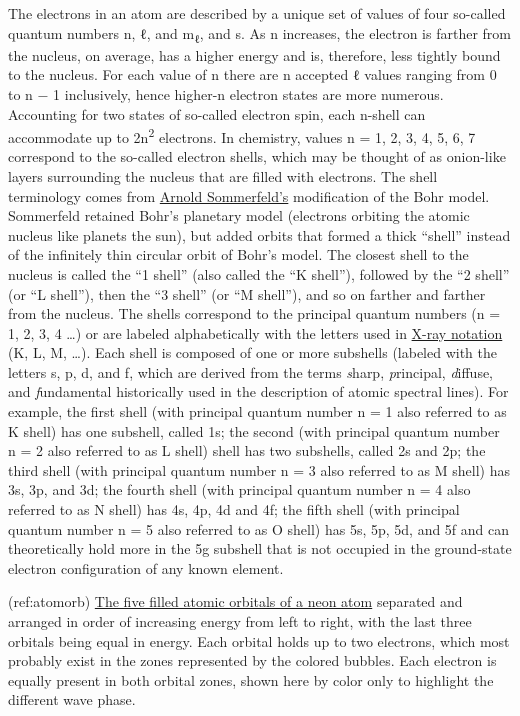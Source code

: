 \documentclass[
]{article}
\begin{document}
The electrons in an atom are described by a unique set of values of four
so-called quantum numbers n, ℓ, and m\textsubscript{ℓ}, and s. As n
increases, the electron is farther from the nucleus, on average, has a
higher energy and is, therefore, less tightly bound to the nucleus. For
each value of n there are n accepted ℓ values ranging from 0 to n − 1
inclusively, hence higher-n electron states are more numerous.
Accounting for two states of so-called electron spin, each n-shell can
accommodate up to 2n\textsuperscript{2} electrons. In chemistry, values
n = 1, 2, 3, 4, 5, 6, 7 correspond to the so-called electron shells,
which may be thought of as onion-like layers surrounding the nucleus
that are filled with electrons. The shell terminology comes from
\href{https://en.wikipedia.org/wiki/Arnold_Sommerfeld}{Arnold
Sommerfeld's} modification of the Bohr model. Sommerfeld retained Bohr's
planetary model (electrons orbiting the atomic nucleus like planets the
sun), but added orbits that formed a thick ``shell'' instead of the
infinitely thin circular orbit of Bohr's model. The closest shell to the
nucleus is called the ``1 shell'' (also called the ``K shell''),
followed by the ``2 shell'' (or ``L shell''), then the ``3 shell'' (or
``M shell''), and so on farther and farther from the nucleus. The shells
correspond to the principal quantum numbers (n = 1, 2, 3, 4 \ldots) or
are labeled alphabetically with the letters used in
\href{https://en.wikipedia.org/wiki/x-ray_notation}{X-ray notation} (K,
L, M, \ldots). Each shell is composed of one or more subshells (labeled
with the letters s, p, d, and f, which are derived from the terms
\emph{s}harp, \emph{p}rincipal, \emph{d}iffuse, and \emph{f}undamental
historically used in the description of atomic spectral lines). For
example, the first shell (with principal quantum number n = 1 also
referred to as K shell) has one subshell, called 1s; the second (with
principal quantum number n = 2 also referred to as L shell) shell has
two subshells, called 2s and 2p; the third shell (with principal quantum
number n = 3 also referred to as M shell) has 3s, 3p, and 3d; the fourth
shell (with principal quantum number n = 4 also referred to as N shell)
has 4s, 4p, 4d and 4f; the fifth shell (with principal quantum number n
= 5 also referred to as O shell) has 5s, 5p, 5d, and 5f and can
theoretically hold more in the 5g subshell that is not occupied in the
ground-state electron configuration of any known element.

(ref:atomorb)
\href{https://commons.wikimedia.org/wiki/File:S-p-Orbitals.svg}{The five
filled atomic orbitals of a neon atom} separated and arranged in order
of increasing energy from left to right, with the last three orbitals
being equal in energy. Each orbital holds up to two electrons, which
most probably exist in the zones represented by the colored bubbles.
Each electron is equally present in both orbital zones, shown here by
color only to highlight the different wave phase.
\end{document}
